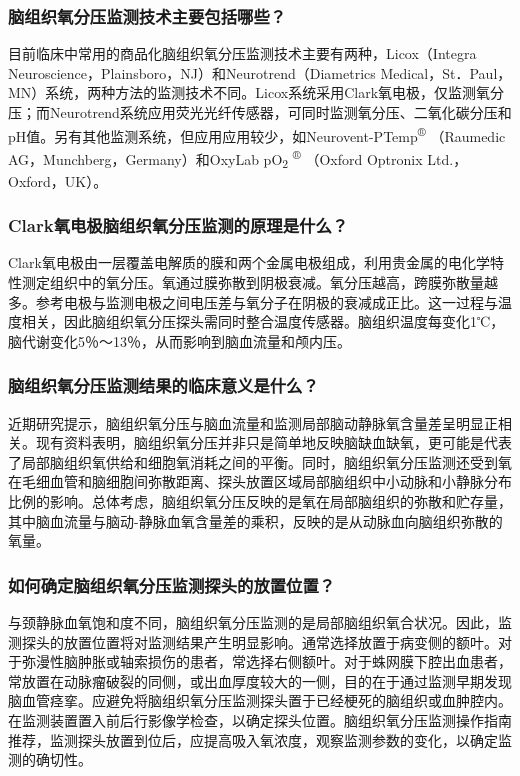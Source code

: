 \subsubsection{脑组织氧分压监测技术主要包括哪些？}

目前临床中常用的商品化脑组织氧分压监测技术主要有两种，Licox（Integra
Neuroscience，Plainsboro，NJ）和Neurotrend（Diametrics
Medical，St．Paul，MN）系统，两种方法的监测技术不同。Licox系统采用Clark氧电极，仅监测氧分压；而Neurotrend系统应用荧光光纤传感器，可同时监测氧分压、二氧化碳分压和pH值。另有其他监测系统，但应用应用较少，如Neurovent-PTemp\textsuperscript{®}
（Raumedic AG，Munchberg，Germany）和OxyLab pO\textsubscript{2}
\textsuperscript{®} （Oxford Optronix Ltd.，Oxford，UK）。

\subsubsection{Clark氧电极脑组织氧分压监测的原理是什么？}

Clark氧电极由一层覆盖电解质的膜和两个金属电极组成，利用贵金属的电化学特性测定组织中的氧分压。氧通过膜弥散到阴极衰减。氧分压越高，跨膜弥散量越多。参考电极与监测电极之间电压差与氧分子在阴极的衰减成正比。这一过程与温度相关，因此脑组织氧分压探头需同时整合温度传感器。脑组织温度每变化1℃，脑代谢变化5％～13％，从而影响到脑血流量和颅内压。

\subsubsection{脑组织氧分压监测结果的临床意义是什么？}

近期研究提示，脑组织氧分压与脑血流量和监测局部脑动静脉氧含量差呈明显正相关。现有资料表明，脑组织氧分压并非只是简单地反映脑缺血缺氧，更可能是代表了局部脑组织氧供给和细胞氧消耗之间的平衡。同时，脑组织氧分压监测还受到氧在毛细血管和脑细胞间弥散距离、探头放置区域局部脑组织中小动脉和小静脉分布比例的影响。总体考虑，脑组织氧分压反映的是氧在局部脑组织的弥散和贮存量，其中脑血流量与脑动-静脉血氧含量差的乘积，反映的是从动脉血向脑组织弥散的氧量。

\subsubsection{如何确定脑组织氧分压监测探头的放置位置？}

与颈静脉血氧饱和度不同，脑组织氧分压监测的是局部脑组织氧合状况。因此，监测探头的放置位置将对监测结果产生明显影响。通常选择放置于病变侧的额叶。对于弥漫性脑肿胀或轴索损伤的患者，常选择右侧额叶。对于蛛网膜下腔出血患者，常放置在动脉瘤破裂的同侧，或出血厚度较大的一侧，目的在于通过监测早期发现脑血管痉挛。应避免将脑组织氧分压监测探头置于已经梗死的脑组织或血肿腔内。在监测装置置入前后行影像学检查，以确定探头位置。脑组织氧分压监测操作指南推荐，监测探头放置到位后，应提高吸入氧浓度，观察监测参数的变化，以确定监测的确切性。

